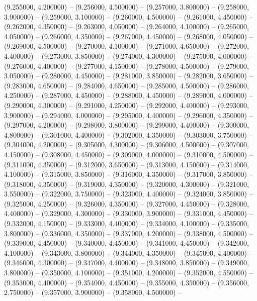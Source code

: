 (9.255000, 4.200000) -- 
(9.256000, 4.500000) -- 
(9.257000, 3.800000) -- 
(9.258000, 3.900000) -- 
(9.259000, 3.100000) -- 
(9.260000, 4.500000) -- 
(9.261000, 4.450000) -- 
(9.262000, 4.350000) -- 
(9.263000, 4.050000) -- 
(9.264000, 4.100000) -- 
(9.265000, 4.050000) -- 
(9.266000, 4.350000) -- 
(9.267000, 4.450000) -- 
(9.268000, 4.050000) -- 
(9.269000, 4.500000) -- 
(9.270000, 4.100000) -- 
(9.271000, 4.650000) -- 
(9.272000, 4.400000) -- 
(9.273000, 3.850000) -- 
(9.274000, 4.300000) -- 
(9.275000, 4.000000) -- 
(9.276000, 4.400000) -- 
(9.277000, 4.150000) -- 
(9.278000, 4.500000) -- 
(9.279000, 3.050000) -- 
(9.280000, 4.450000) -- 
(9.281000, 3.850000) -- 
(9.282000, 3.650000) -- 
(9.283000, 4.650000) -- 
(9.284000, 4.650000) -- 
(9.285000, 4.500000) -- 
(9.286000, 4.250000) -- 
(9.287000, 4.450000) -- 
(9.288000, 4.450000) -- 
(9.289000, 4.000000) -- 
(9.290000, 4.300000) -- 
(9.291000, 4.250000) -- 
(9.292000, 4.400000) -- 
(9.293000, 3.900000) -- 
(9.294000, 4.000000) -- 
(9.295000, 4.400000) -- 
(9.296000, 4.350000) -- 
(9.297000, 4.200000) -- 
(9.298000, 3.800000) -- 
(9.299000, 4.400000) -- 
(9.300000, 4.800000) -- 
(9.301000, 4.400000) -- 
(9.302000, 4.350000) -- 
(9.303000, 3.750000) -- 
(9.304000, 4.200000) -- 
(9.305000, 4.300000) -- 
(9.306000, 4.500000) -- 
(9.307000, 4.150000) -- 
(9.308000, 4.450000) -- 
(9.309000, 4.000000) -- 
(9.310000, 4.500000) -- 
(9.311000, 4.350000) -- 
(9.312000, 3.650000) -- 
(9.313000, 4.150000) -- 
(9.314000, 4.100000) -- 
(9.315000, 3.850000) -- 
(9.316000, 4.350000) -- 
(9.317000, 3.850000) -- 
(9.318000, 4.350000) -- 
(9.319000, 4.350000) -- 
(9.320000, 4.300000) -- 
(9.321000, 3.550000) -- 
(9.322000, 3.750000) -- 
(9.323000, 4.400000) -- 
(9.324000, 3.850000) -- 
(9.325000, 4.250000) -- 
(9.326000, 4.350000) -- 
(9.327000, 4.450000) -- 
(9.328000, 4.400000) -- 
(9.329000, 4.300000) -- 
(9.330000, 3.900000) -- 
(9.331000, 4.450000) -- 
(9.332000, 4.150000) -- 
(9.333000, 4.400000) -- 
(9.334000, 4.100000) -- 
(9.335000, 3.800000) -- 
(9.336000, 4.350000) -- 
(9.337000, 4.200000) -- 
(9.338000, 4.500000) -- 
(9.339000, 4.450000) -- 
(9.340000, 4.450000) -- 
(9.341000, 4.450000) -- 
(9.342000, 4.100000) -- 
(9.343000, 3.800000) -- 
(9.344000, 4.350000) -- 
(9.345000, 4.400000) -- 
(9.346000, 4.300000) -- 
(9.347000, 4.400000) -- 
(9.348000, 3.850000) -- 
(9.349000, 3.800000) -- 
(9.350000, 4.100000) -- 
(9.351000, 4.200000) -- 
(9.352000, 4.550000) -- 
(9.353000, 4.400000) -- 
(9.354000, 4.450000) -- 
(9.355000, 4.350000) -- 
(9.356000, 2.750000) -- 
(9.357000, 3.900000) -- 
(9.358000, 4.500000) -- 
